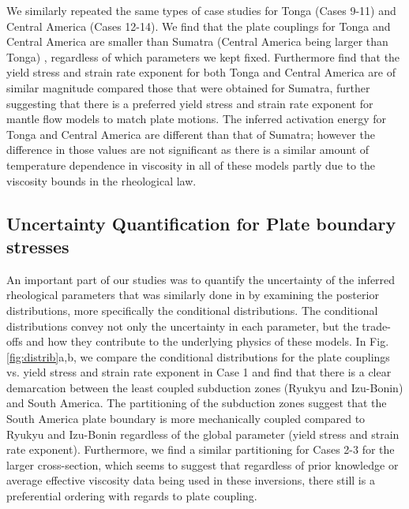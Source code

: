 \documentclass[12pt]{article}
\begin{document}
We similarly repeated the same types of case studies for Tonga (Cases 9-11) and Central America (Cases 12-14). We find that the plate couplings for Tonga and Central America are smaller than Sumatra (Central America being larger than Tonga) , regardless of which parameters we kept fixed. Furthermore find that the yield stress and strain rate exponent for both Tonga and Central America are of similar magnitude compared those that were obtained for Sumatra, further suggesting that there is a preferred yield stress and strain rate exponent for mantle flow models to match plate motions. The inferred activation energy for Tonga and Central America are different than that of Sumatra; however the difference in those values are not significant as there is a similar amount of temperature dependence in viscosity in all of these models partly due to the viscosity bounds in the rheological law.







\subsection{Uncertainty Quantification for Plate boundary stresses}

An important part of our studies was to quantify the uncertainty of the inferred rheological parameters that was similarly done in \citep{ratnaswamy2015adjoint} by examining the posterior distributions, more specifically the conditional distributions. The conditional distributions convey not only the uncertainty in each parameter, but the trade-offs and how they contribute to the underlying physics of these models. In Fig.\ref{fig:distrib}a,b, we compare the conditional distributions for the plate couplings vs. yield stress and strain rate exponent in Case 1 and find that there is a clear demarcation between the least coupled subduction zones (Ryukyu and Izu-Bonin) and South America. The partitioning of the subduction zones suggest that the South America plate boundary is more mechanically coupled compared to Ryukyu and Izu-Bonin regardless of the global parameter (yield stress and strain rate exponent). Furthermore, we find a similar partitioning for Cases 2-3 for the larger cross-section, which seems to suggest that regardless of prior knowledge or average effective viscosity data being used in these inversions, there still is a preferential ordering with regards to plate coupling. 
\end{document}
